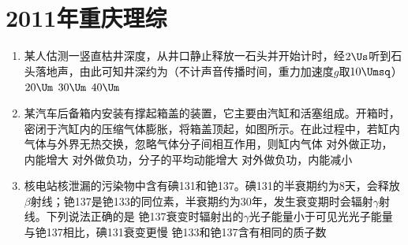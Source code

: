 \documentclass[\gkver]{gaokaozhenti}
\begin{document}
\chapter{2011年重庆理综}

\begin{enumerate}
\item
某人估测一竖直枯井深度，从井口静止释放一石头并开始计时，经$2\Us$听到石头落地声，由此可知井深约为（不计声音传播时间，重力加速度$g$取$10\Umsq$）
\fourchoices[answer=B]
{$10\Um$}
{$20\Um$}
{$30\Um$}
{$40\Um$}

\item
某汽车后备箱内安装有撑起箱盖的装置，它主要由汽缸和活塞组成。开箱时，密闭于汽缸内的压缩气体膨胀，将箱盖顶起，如图所示。在此过程中，若缸内气体与外界无热交换，忽略气体分子间相互作用，则缸内气体
\onepicture[w=5.00cm]{}
{对外做正功，内能增大}
{对外做负功，分子的平均动能增大}
{对外做负功，内能减小}

\item
核电站核泄漏的污染物中含有碘131和铯137。碘131的半衰期约为8天，会释放$\beta$射线；铯137是铯133的同位素，半衰期约为30年，发生衰变期时会辐射$\gamma$射线。下列说法正确的是
{铯137衰变时辐射出的$\gamma$光子能量小于可见光光子能量}
{与铯137相比，碘131衰变更慢}
{铯133和铯137含有相同的质子数}


\end{enumerate}
\end{document}
